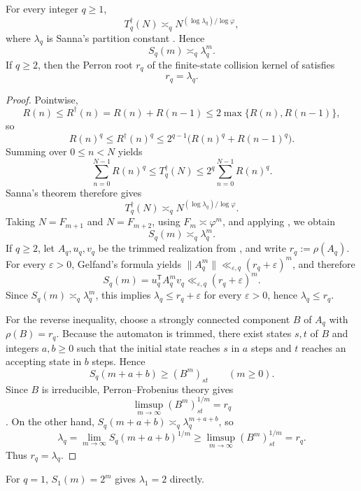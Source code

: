\begin{theorem}
\label{thm:all-q-transfer}
For every integer \(q\ge 1\),
\[
  T_q^\dagger(N)\asymp_q N^{(\log \lambda_q)/\log\varphi},
\]
where \(\lambda_q\) is Sanna's partition constant \cite[Thm.~1.1]{Sanna2025}.  Hence
\[
  S_q(m)\asymp_q \lambda_q^m.
\]
If \(q\ge 2\), then the Perron root \(r_q\) of the finite-state collision
kernel of  satisfies
\[
  r_q=\lambda_q.
\]
\end{theorem}

\begin{proof}
Pointwise,
\[
  R(n)\le R^\dagger(n)=R(n)+R(n-1)\le 2\max\{R(n),R(n-1)\},
\]
so
\[
  R(n)^q\le R^\dagger(n)^q
  \le 2^{q-1}\bigl(R(n)^q+R(n-1)^q\bigr).
\]
Summing over \(0\le n<N\) yields
\[
  \sum_{n=0}^{N-1} R(n)^q
  \le
  T_q^\dagger(N)
  \le
  2^q\sum_{n=0}^{N-1} R(n)^q.
\]
Sanna's theorem \cite[Thm.~1.1]{Sanna2025} therefore gives
\[
  T_q^\dagger(N)\asymp_q N^{(\log \lambda_q)/\log\varphi}.
\]
Taking \(N=F_{m+1}\) and \(N=F_{m+2}\), using \(F_m\asymp\varphi^m\), and
applying , we obtain
\[
  S_q(m)\asymp_q \lambda_q^m.
\]
If \(q\ge 2\), let \(A_q,u_q,v_q\) be the trimmed realization from
, and write \(r_q:=\rho(A_q)\).  For every
\(\varepsilon>0\), Gelfand's formula yields
\(\|A_q^m\|\ll_{\varepsilon,q}(r_q+\varepsilon)^m\), and therefore
\[
  S_q(m)=u_q^{\mathsf T}A_q^m v_q\ll_{\varepsilon,q}(r_q+\varepsilon)^m.
\]
Since \(S_q(m)\asymp_q \lambda_q^m\), this implies
\(\lambda_q\le r_q+\varepsilon\) for every \(\varepsilon>0\), hence
\(\lambda_q\le r_q\).

For the reverse inequality, choose a strongly connected component \(B\) of
\(A_q\) with \(\rho(B)=r_q\).  Because the automaton is trimmed, there exist
states \(s,t\) of \(B\) and integers \(a,b\ge 0\) such that the initial state
reaches \(s\) in \(a\) steps and \(t\) reaches an accepting state in \(b\)
steps.  Hence
\[
  S_q(m+a+b)\ge (B^m)_{st}
  \qquad (m\ge 0).
\]
Since \(B\) is irreducible, Perron--Frobenius theory gives
\[
  \limsup_{m\to\infty}(B^m)_{st}^{1/m}=r_q
\]
\cite[Ch.~1]{Seneta2006}.  On the other hand,
\(S_q(m+a+b)\asymp_q \lambda_q^{m+a+b}\), so
\[
  \lambda_q
  =
  \lim_{m\to\infty}S_q(m+a+b)^{1/m}
  \ge
  \limsup_{m\to\infty}(B^m)_{st}^{1/m}
  =
  r_q.
\]
Thus \(r_q=\lambda_q\).
\end{proof}

\begin{remark}[The case \texorpdfstring{$q=1$}{q=1}]
\label{rem:lambda-one}
For \(q=1\), \(S_1(m)=2^m\) gives \(\lambda_1=2\) directly.
\end{remark}

